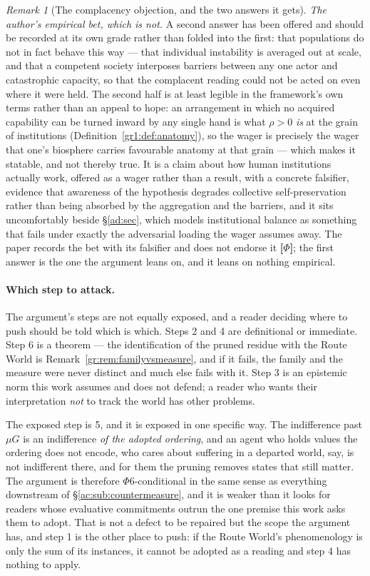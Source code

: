 \documentclass[11pt]{article}
\numberwithin{equation}{section}
\theoremstyle{plain}
\theoremstyle{definition}
\theoremstyle{remark}
\newtheorem{remark}[theorem]{Remark}
\begin{document}
\begin{remark}[The complacency objection, and the two answers it
gets]
\emph{The author's empirical bet, which is not.} A second answer has
been offered and should be recorded at its own grade rather than folded
into the first: that populations do not in fact behave this way ---
that individual instability is averaged out at scale, and that a
competent society interposes barriers between any one actor and
catastrophic capacity, so that the complacent reading could not be acted
on even where it were held. The second half is at least legible in the
framework's own terms rather than an appeal to hope: an arrangement in
which no acquired capability can be turned inward by any single hand is
what $\rho>0$ \emph{is} at the grain of institutions
(Definition~\ref{gr1:def:anatomy}), so the wager is precisely the wager
that one's biosphere carries favourable anatomy at that grain --- which
makes it statable, and not thereby true. It is a claim about how human
institutions actually work, offered as a wager rather than a result,
with a concrete falsifier, evidence that awareness of the hypothesis
degrades collective self-preservation rather than being absorbed by the
aggregation and the barriers, and it sits uncomfortably beside
\S\ref{ad:sec}, which models institutional balance as something that
fails under exactly the adversarial loading the wager assumes away. The
paper records the bet with its falsifier and does not endorse it
\textbf{[$\Phi$]}; the first answer is the one the argument leans on,
and it leans on nothing empirical.
\end{remark}

\paragraph{Which step to attack.}\label{gc:rem:actingcost}
The argument's steps are not equally exposed, and a reader deciding
where to push should be told which is which. Steps 2 and 4 are definitional or immediate. Step 6 is a theorem ---
the identification of the pruned residue with the Route World is
Remark~\ref{gr:rem:familyvsmeasure}, and if it fails, the family and the
measure were never distinct and much else fails with it. Step 3 is an
epistemic norm this work assumes and does not defend; a reader who wants
their interpretation \emph{not} to track the world has other problems.

The exposed step is 5, and it is exposed in one specific way. The
indifference past $\mu G$ is an indifference \emph{of the adopted
ordering}, and an agent who holds values the ordering does not encode, who cares about suffering in a departed world, say, is not
indifferent there, and for them the pruning removes states that still
matter. The argument is therefore $\Phi6$-conditional in the same sense
as everything downstream of \S\ref{ac:sub:countermeasure}, and it is
weaker than it looks for readers whose evaluative commitments outrun the
one premise this work asks them to adopt. That is not a defect to be
repaired but the scope the argument has, and step 1 is the other place to
push: if the Route World's phenomenology is only the sum of its
instances, it cannot be adopted as a reading and step 4 has nothing to
apply.
\end{document}
